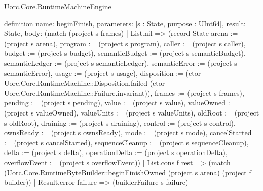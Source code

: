 \begin{lexlean}{Uorc.Core.RuntimeMachineEngine}
\begin{semanticmodule}
definition{
  name: beginFinish,
  parameters: [s : State, purpose : UInt64],
  result: State,
  body: (match (project s frames)
    | List.nil => (record State {arena := (project s arena), program := (project s program), caller := (project s caller), budget := (project s budget), semanticBudget := (project s semanticBudget), semanticLedger := (project s semanticLedger), semanticError := (project s semanticError), usage := (project s usage), disposition := (ctor Uorc.Core.RuntimeMachine::Disposition.failed (ctor Uorc.Core.RuntimeMachine::Failure.invariant)), frames := (project s frames), pending := (project s pending), value := (project s value), valueOwned := (project s valueOwned), valueUnits := (project s valueUnits), oldRoot := (project s oldRoot), draining := (project s draining), control := (project s control), ownsReady := (project s ownsReady), mode := (project s mode), cancelStarted := (project s cancelStarted), sequenceCleanup := (project s sequenceCleanup), delta := (project s delta), operationDelta := (project s operationDelta), overflowEvent := (project s overflowEvent)})
    | List.cons f rest => (match (Uorc.Core.RuntimeByteBuilder::beginFinishOwned (project s arena) (project f builder))
      | Result.error failure => (builderFailure s failure)
}
\end{semanticmodule}
\end{lexlean}
